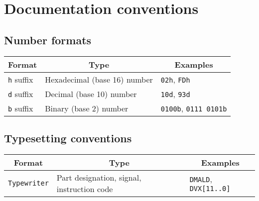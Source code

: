 \section{Documentation conventions}

\subsection{Number formats}
\begin{tabularx}{\linewidth}{|l|l|X|}
	\hline
	\multicolumn{1}{|c|}{{\bf Format}}	&
	\multicolumn{1}{c|}{{\bf Type}}		&
	\multicolumn{1}{c|}{{\bf Examples}}	\\	\hline
	{\tt h} suffix	&	Hexadecimal (base 16) number	&	{\tt 02h}, {\tt FDh}				\\	\hline
	{\tt d} suffix	&	Decimal (base 10) number		&	{\tt 10d}, {\tt 93d}				\\	\hline
	{\tt b} suffix	&	Binary (base 2) number			&	{\tt 0100b}, {\tt 0111 0101b}		\\	\hline
\end{tabularx}

\subsection{Typesetting conventions}
\begin{tabularx}{\linewidth}{|l|l|X|}
	\hline
	\multicolumn{1}{|c|}{{\bf Format}}	&
	\multicolumn{1}{c|}{{\bf Type}}		&
	\multicolumn{1}{c|}{{\bf Examples}}	\\	\hline
	{\tt Typewriter}	&	Part designation, signal, instruction code	&	{\tt DMALD}, {\tt DVX[11..0]}	\\	\hline
\end{tabularx}
